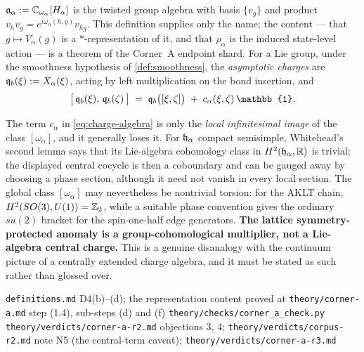 \begin{definition}
\label{def:charge-algebra}
$\mathfrak{a}_{\alpha} := \mathbb{C}_{\omega_{\alpha}}[H_{\alpha}]$ is the twisted group
algebra with basis $\{v_{g}\}$ and product
$v_{h} v_{g} = e^{i\omega_{\alpha}(h,g)} v_{hg}$. This definition supplies
only the name; the content --- that $g \mapsto V_{\alpha}(g)$ is a
$*$-representation of it, and that $\rho_{\alpha}$ is the induced state-level
action --- is a theorem of the Corner~A endpoint shard. For a Lie group,
under the smoothness hypothesis of \cref{def:smoothness}, the
\emph{asymptotic charges} are $\mathfrak{q}_{b}(\xi) := X_{\alpha}(\xi)$, acting by
left multiplication on the bond insertion, and
\begin{equation}
  \bigl[\, \bcharge_{b}(\xi), \, \bcharge_{b}(\zeta) \,\bigr]
  \;=\; \bcharge_{b}\bigl([\xi,\zeta]\bigr)
        \; + \; c_{\alpha}(\xi,\zeta) \, \mathbb{1} .
  \label{eq:charge-algebra}
\end{equation}
\end{definition}

\begin{remark}
\label{rem:no-central-charge}
The term $c_{\alpha}$ in \eqref{eq:charge-algebra} is only the \emph{local
infinitesimal image} of the class $[\omega_{\alpha}]$, and it generally loses
it. For $\mathfrak{h}_{\alpha}$ compact semisimple, Whitehead's second lemma says
that its Lie-algebra cohomology class in $H^{2}(\mathfrak{h}_{\alpha},\mathbb{R})$ is
trivial; the displayed central cocycle is then a coboundary and can be gauged
away by choosing a phase section, although it need not vanish in every local
section. The global class $[\omega_{\alpha}]$ may nevertheless be nontrivial
torsion: for the AKLT chain, $H^{2}(SO(3),U(1)) = \mathbb{Z}_{2}$, while a suitable
phase convention gives the ordinary $su(2)$ bracket for the spin-one-half edge
generators. \textbf{The lattice symmetry-protected anomaly is a
group-cohomological multiplier, not a Lie-algebra central charge.} This is a
genuine disanalogy with the continuum picture of a centrally extended charge
algebra, and it must be stated as such rather than glossed over.
\end{remark}

%
{\texttt{definitions.md} D4(b)--(d); the representation content proved at
 \texttt{theory/corner-a.md} step (1.4), sub-steps (d) and (f)}%
{\texttt{theory/checks/corner\_a\_check.py}}%
{\texttt{theory/verdicts/corner-a-r2.md} objections 3, 4;
 \texttt{theory/verdicts/corpus-r2.md} note N5 (the central-term caveat);
 \texttt{theory/verdicts/corner-a-r3.md}}

